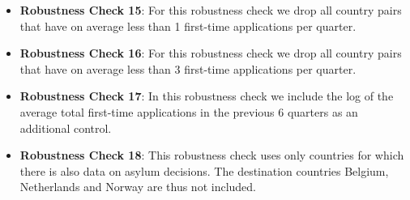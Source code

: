 \documentclass[11pt,a4paper]{scrartcl}
\begin{document}
\begin{itemize}
	\item \textbf{Robustness Check 15}: For this robustness check we drop all country pairs that have on average less than 1 first-time applications per quarter. 
	
	\item \textbf{Robustness Check 16}: For this robustness check we drop all country pairs that have on average less than 3 first-time applications per quarter. 
	
	\item \textbf{Robustness Check 17}: In this robustness check we include the log of the average total first-time applications in the previous 6 quarters as an additional control.  
	 	
	\item \textbf{Robustness Check 18}: This robustness check uses only countries for which there is also data on asylum decisions. The destination countries Belgium, Netherlands and Norway are thus not included.
	
\end{itemize}


\clearpage
\FloatBarrier

\end{document}
